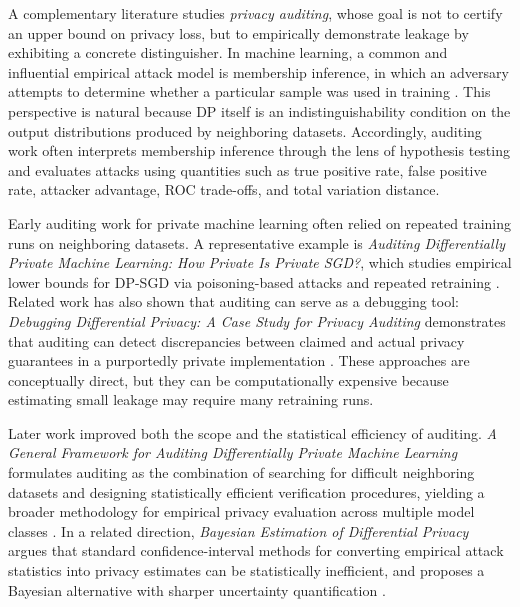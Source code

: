 \documentclass[10pt]{article}
\begin{document}
A complementary literature studies \emph{privacy auditing}, whose goal is not to certify an upper bound on privacy loss, but to empirically demonstrate leakage by exhibiting a concrete distinguisher. In machine learning, a common and influential empirical attack model is membership inference, in which an adversary attempts to determine whether a particular sample was used in training \cite{shokri2017membership}. This perspective is natural because DP itself is an indistinguishability condition on the output distributions produced by neighboring datasets. Accordingly, auditing work often interprets membership inference through the lens of hypothesis testing and evaluates attacks using quantities such as true positive rate, false positive rate, attacker advantage, ROC trade-offs, and total variation distance.

Early auditing work for private machine learning often relied on repeated training runs on neighboring datasets. A representative example is \emph{Auditing Differentially Private Machine Learning: How Private Is Private SGD?}, which studies empirical lower bounds for DP-SGD via poisoning-based attacks and repeated retraining \cite{jagielski2020auditing}. Related work has also shown that auditing can serve as a debugging tool: \emph{Debugging Differential Privacy: A Case Study for Privacy Auditing} demonstrates that auditing can detect discrepancies between claimed and actual privacy guarantees in a purportedly private implementation \cite{tramer2022debugging}. These approaches are conceptually direct, but they can be computationally expensive because estimating small leakage may require many retraining runs.

Later work improved both the scope and the statistical efficiency of auditing. \emph{A General Framework for Auditing Differentially Private Machine Learning} formulates auditing as the combination of searching for difficult neighboring datasets and designing statistically efficient verification procedures, yielding a broader methodology for empirical privacy evaluation across multiple model classes \cite{lu2022general}. In a related direction, \emph{Bayesian Estimation of Differential Privacy} argues that standard confidence-interval methods for converting empirical attack statistics into privacy estimates can be statistically inefficient, and proposes a Bayesian alternative with sharper uncertainty quantification \cite{zanella2023bayesian}.
\end{document}
